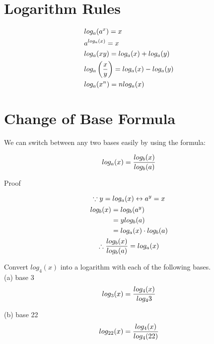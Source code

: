 \section{Logarithm Rules}

\begin{theorem}
	\begin{align}
		 & log_a(a^x) = x                                      \\
		 & a^{log_a(x)} = x                                    \\
		 & log_a(xy) = log_a(x) + log_a(y)                     \\
		 & log_a\left({x \over y}\right) = log_a(x) - log_a(y) \\
		 & log_a(x^n) = nlog_a(x)
	\end{align}
\end{theorem}

\section{Change of Base Formula}

We can switch between any two bases easily by using the formula: \\

\begin{theorem}
	\begin{align}
		log_a(x) = {log_b(x) \over log_b(a)}
	\end{align}
\end{theorem}

\begin{exercise}\nonumber
	Proof
	
	\begin{gather*}
		\because y = log_a(x) \leftrightarrow a^y = x \\
		\begin{align}
			log_b(x) & = log_b(a^y)              \\
			         & = ylog_b(a)               \\
			         & = log_a(x) \cdot log_b(a)
		\end{align}
		\\
		\therefore {log_b(x) \over log_b(a)} = log_a(x)
	\end{gather*}
\end{exercise}

\begin{exercise}\nonumber
	Convert $ log_4(x) $ into a logarithm with each of the following bases. \\

	(a) base 3
	$$
		log_3(x) = {log_4(x) \over log_4{3}}
	$$

	(b) base 22
	$$
		log_{22}(x) = {log_4(x) \over log_4(22)}
	$$
\end{exercise}

